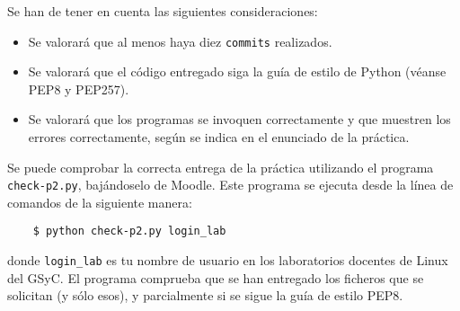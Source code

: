 \documentclass[11pt,a4paper]{article}
\begin{document}
Se han de tener en cuenta las siguientes consideraciones:
\begin{itemize}
  \item Se valorará que al menos haya diez \texttt{commits} realizados.
  \item Se valorará que el código entregado siga la guía de estilo de Python (véanse PEP8 y PEP257).
  \item Se valorará que los programas se invoquen correctamente y que muestren los errores correctamente, según se indica en el enunciado de la práctica.
\end{itemize}

Se puede comprobar la correcta entrega de la práctica utilizando el programa \texttt{check-p2.py}, bajándoselo de Moodle. Este programa se ejecuta desde la línea de comandos de la siguiente manera:
\begin{verbatim}
	$ python check-p2.py login_lab
\end{verbatim}

donde \texttt{login\_lab} es tu nombre de usuario en los laboratorios docentes de Linux del GSyC. El programa comprueba que se han entregado los ficheros que se solicitan (y sólo esos), y parcialmente si se sigue la guía de estilo PEP8.
\end{document}
